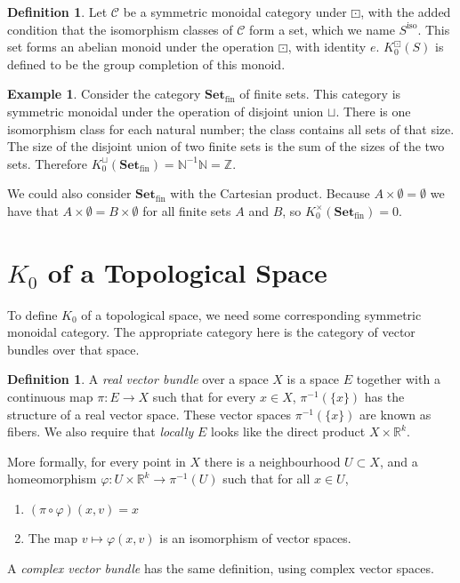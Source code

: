 \documentclass[10pt,a4paper]{article}
\theoremstyle{definition}
\newtheorem{example}[theorem]{Example}
\newtheorem{definition}[theorem]{Definition}
\begin{document}
\begin{definition}
Let $\mathcal{C}$ be a symmetric monoidal category under $\boxdot$, with the added condition that the isomorphism classes of $\mathcal{C}$ form a set, which we name $S^{\text{iso}}$. This set forms an abelian monoid under the operation $\boxdot$, with identity $e$. $K_0^{\boxdot}(S)$ is defined to be the group completion of this monoid.
\end{definition}

\begin{example}
Consider the category $\mathbf{Set}_\text{fin}$ of finite sets. This category is symmetric monoidal under the operation of disjoint union $\sqcup$. There is one isomorphism class for each natural number; the class contains all sets of that size. The size of the disjoint union of two finite sets is the sum of the sizes of the two sets. Therefore $K_0^{\sqcup}(\mathbf{Set}_\text{fin}) = \mathbb{N}^{-1}\mathbb{N} = \mathbb{Z}$.

We could also consider $\mathbf{Set}_\text{fin}$ with the Cartesian product. Because $A \times \emptyset = \emptyset$ we have that $A \times \emptyset = B \times \emptyset$ for all finite sets $A$ and $B$, so $K_0^{\times}(\mathbf{Set}_\text{fin}) = 0$.
\end{example}

\section{$K_0$ of a Topological Space}

To define $K_0$ of a topological space, we need some corresponding symmetric monoidal category. The appropriate category here is the category of vector bundles over that space.

\begin{definition}
A \emph{real vector bundle} over a space $X$ is a space $E$ together with a continuous map $\pi : E \to X$ such that for every $x \in X$, $\pi^{-1}(\{x\})$ has the structure of a real vector space. These vector spaces $\pi^{-1}(\{x\})$ are known as fibers. We also require that \emph{locally} $E$ looks like the direct product $X \times \mathbb{R}^k$.

More formally, for every point in $X$ there is a neighbourhood $U \subset X$, and a homeomorphism $\varphi : U \times \mathbb{R}^k \to \pi^{-1}(U)$ such that for all $x \in U$,
\begin{enumerate}
\item $(\pi \circ \varphi)(x, v) = x$
\item The map $v \mapsto \varphi(x, v)$ is an isomorphism of vector spaces.
\end{enumerate}

A \emph{complex vector bundle} has the same definition, using complex vector spaces.
\end{definition}
\end{document}
